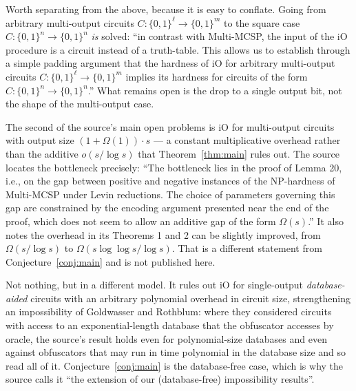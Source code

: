 \documentclass{conjura-conjecture}
\newcommand{\Om}{\Omega}
\newcommand{\bits}{\{0,1\}}
\begin{document}
\begin{remark}\label{rem:padding}
Worth separating from the above, because it is easy to conflate. Going
from arbitrary multi-output circuits $C : \bits^{\ell} \to \bits^{m}$ to
the square case $C : \bits^{n} \to \bits^{n}$ \emph{is} solved: ``in
contrast with Multi-MCSP, the input of the iO procedure is a circuit
instead of a truth-table. This allows us to establish through a simple
padding argument that the hardness of iO for arbitrary multi-output
circuits $C : \bits^{\ell} \to \bits^{m}$ implies its hardness for
circuits of the form $C : \bits^{n} \to \bits^{n}$.'' What remains open is
the drop to a single output bit, not the shape of the multi-output case.
\end{remark}

\begin{remark}\label{rem:neighbour}
The second of the source's main open problems is iO for multi-output
circuits with output size $(1 + \Om(1))\cdot s$ --- a constant
multiplicative overhead rather than the additive $o(s/\log s)$ that
Theorem~\ref{thm:main} rules out. The source locates the bottleneck
precisely: ``The bottleneck lies in the proof of Lemma 20, i.e., on the
gap between positive and negative instances of the NP-hardness of
Multi-MCSP under Levin reductions. The choice of parameters governing
this gap are constrained by the encoding argument presented near the end
of the proof, which does not seem to allow an additive gap of the form
$\Om(s)$.'' It also notes the overhead in its Theorems 1 and 2 can be
slightly improved, from $\Om(s/\log s)$ to $\Om(s\log\log s/\log s)$.
That is a different statement from Conjecture~\ref{conj:main} and is not
published here.
\end{remark}

\begin{remark}\label{rem:database}
Not nothing, but in a different model. It rules out iO for single-output
\emph{database-aided} circuits with an arbitrary polynomial overhead in
circuit size, strengthening an impossibility of Goldwasser and Rothblum:
where they considered circuits with access to an exponential-length
database that the obfuscator accesses by oracle, the source's result
holds even for polynomial-size databases and even against obfuscators
that may run in time polynomial in the database size and so read all of
it. Conjecture~\ref{conj:main} is the database-free case, which is why
the source calls it ``the extension of our (database-free) impossibility
results''.
\end{remark}
\end{document}
